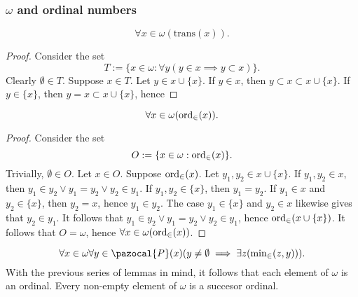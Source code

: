 \subsubsection{$\omega$ and ordinal numbers}
\begin{lemma}
    $$\forall x\in \omega(\mathrm{trans}(x)).$$
\end{lemma}
\begin{proof}
    Consider the set $$T:=\{x\in \omega: \forall y( y\in x\implies y\subset x)\}.$$ 
    Clearly $\emptyset\in T$. Suppose $x\in T$. Let $y\in x\cup \{x\}$. If $y\in x$, then $y\subset x\subset x\cup\{x\}$. If $y\in \{x\}$, then $y = x\subset x\cup \{x\}$, hence   
\end{proof}
\begin{lemma}
    $$\forall x\in \omega(\mathrm{ord}_\in(x)).$$
\end{lemma}
\begin{proof}
    Consider the set $$O := \{x\in \omega : \mathrm{ord}_\in(x)\}.$$ Trivially, $\emptyset\in O$. Let $x\in O$. Suppose $\mathrm{ord}_\in(x)$. Let $y_1,y_2\in x\cup \{x\}$. If $y_1,y_2\in x$, then $y_1\in y_2\vee y_1=y_2\vee y_2\in y_1$. If $y_1,y_2\in \{x\}$, then $y_1=y_2$. If $y_1\in x$ and $y_2\in \{x\}$, then $y_2=x$, hence $y_1\in y_2$. The case $y_1\in\{x\}$ and $y_2\in x$ likewise gives that $y_2\in y_1$. It follows that $y_1\in y_2 \vee y_1 = y_2\vee y_2\in y_1$, hence $\mathrm{ord}_\in(x\cup\{x\})$. It follows that $O=\omega$, hence $\forall x\in \omega(\mathrm{ord}_\in(x))$.
\end{proof}
\begin{lemma}
    $$\forall x\in \omega\forall y\in \pazocal{P}(x)(y\neq \emptyset\implies \exists z(\textstyle{\min}_\in(z,y))).$$
    With the previous series of lemmas in mind, it follows that each element of $\omega$ is an ordinal. Every non-empty element of $\omega$ is a succesor ordinal.
\end{lemma}
